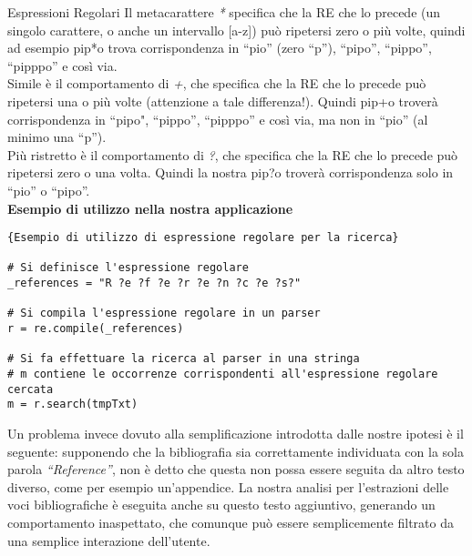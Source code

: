 \begin{subsubsection}{Espressioni Regolari}
Il metacarattere \textit{*} specifica che la RE che lo precede (un singolo carattere, o anche un intervallo [a-z]) può ripetersi zero o più volte, quindi ad esempio pip*o trova corrispondenza in ``pio'' (zero ``p''), ``pipo'', ``pippo'', ``pipppo'' e così via.\\

Simile è il comportamento di \textit{+}, che specifica che la RE che lo precede può ripetersi una o più volte (attenzione a tale differenza!). Quindi pip+o troverà corrispondenza in ``pipo", ``pippo'', ``pipppo'' e così via, ma non in ``pio'' (al minimo una ``p'').\\

Più ristretto è il comportamento di \textit{?}, che specifica che la RE che lo precede può ripetersi zero o una volta. Quindi la nostra pip?o troverà corrispondenza solo in ``pio'' o ``pipo''.\\

\textbf{Esempio di utilizzo nella nostra applicazione}
\begin{lstlisting}[frame=r,caption=\textit{Esempio di utilizzo di espressione regolare per la ricerca} ,breaklines=true,basicstyle=\small]{Esempio di utilizzo di espressione regolare per la ricerca}

# Si definisce l'espressione regolare
_references = "R ?e ?f ?e ?r ?e ?n ?c ?e ?s?"

# Si compila l'espressione regolare in un parser
r = re.compile(_references)

# Si fa effettuare la ricerca al parser in una stringa
# m contiene le occorrenze corrispondenti all'espressione regolare cercata
m = r.search(tmpTxt)
\end{lstlisting}

\end{subsubsection}

Un problema invece dovuto alla semplificazione introdotta dalle nostre ipotesi è il seguente: supponendo che la bibliografia sia correttamente individuata con la sola parola \textit{``Reference''}, non è detto che questa non possa essere seguita da altro testo diverso, come per esempio un'appendice. La nostra analisi per l'estrazioni delle voci bibliografiche è eseguita anche su questo testo aggiuntivo, generando un comportamento inaspettato, che comunque può essere semplicemente filtrato da una semplice interazione dell'utente.

